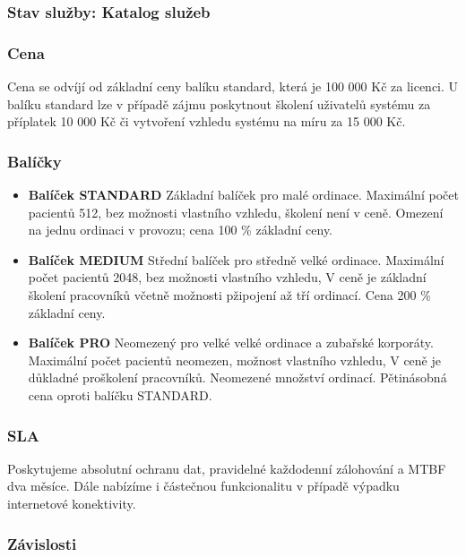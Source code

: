 \documentclass[11pt, a4paper, titlepage]{article}
\begin{document}
	\subsubsection*{Stav služby: Katalog služeb}

	\subsubsection*{Cena}
	\noindent Cena se odvíjí od základní ceny balíku standard, která je 100 000 Kč za licenci. U balíku standard lze v případě zájmu poskytnout školení uživatelů systému za příplatek 10 000 Kč či vytvoření vzhledu systému na míru za 15 000 Kč.

	\subsubsection*{Balíčky}

	\begin{itemize}		
		\item \textbf{Balíček STANDARD} Základní balíček pro malé ordinace. Maximální počet pacientů 512, bez možnosti vlastního vzhledu, školení není v ceně. Omezení na jednu ordinaci v provozu; cena 100 \% základní ceny.

		\item \textbf{Balíček MEDIUM} Střední balíček pro středně velké ordinace. Maximální počet pacientů 2048, bez možnosti vlastního vzhledu, V ceně je základní školení pracovníků včetně možnosti pžipojení až tří ordinací. Cena 200 \% základní ceny.

		\item \textbf{Balíček PRO} Neomezený pro velké velké ordinace a zubařské korporáty. Maximální počet pacientů neomezen, možnost vlastního vzhledu, V ceně je důkladné proškolení pracovníků. Neomezené množství ordinací. Pětinásobná cena oproti balíčku STANDARD.
	\end{itemize}

	\subsubsection*{SLA}

	Poskytujeme absolutní ochranu dat, pravidelné každodenní zálohování a MTBF dva měsíce. Dále nabízíme i částečnou funkcionalitu v případě výpadku internetové konektivity.

	\subsubsection*{Závislosti}
\end{document}
